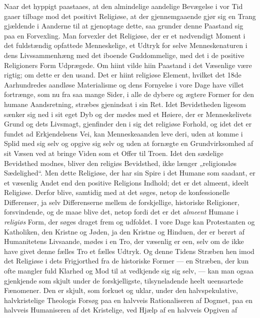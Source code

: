 \documentclass[12pt,a4paper,openany]{book}
\newcommand{\opage}[1]{\marginnote{\footnotesize\textit{[#1]}}}
\begin{document}
Naar det hyppigt paastaaes, at den almindelige aandelige
Bevægelse i vor Tid gaaer tilbage mod det positivt
Religiøse, at der gjennemgaaende gjør sig en Trang gjældende
i Aanderne til at gjenoptage dette, saa grunder denne
Paastand sig paa en Forvexling. Man forvexler det Religiøse,
der er et nødvendigt Moment i det fuldstændig opfattede
Menneskelige, et Udtryk for selve Menneskenaturen i
dens Livssammenhæng med det iboende Guddommelige, med
det i de positive Religioners Form Udprægede. Om hiint
vilde hiin Paastand i det Væsenlige være rigtig; om dette
er den usand. Det er hiint religiøse Element, hvilket det
18de Aarhundredes aandløse Materialisme og dens Fornyelse
i vore Dage have villet fortrænge, som nu fra saa
mange Sider, i alle de dybere og ægtere Former for den
humane Aandsretning, stræbes gjenindsat i sin Ret. Idet
Bevidstheden ligesom sænker sig ned i sit eget Dyb og der
mødes med et Høiere, der er Menneskelivets Grund og dets
\opage{296}Livsmagt, gjenfinder den i sig det religiøse Forhold, og idet
det er fundet ad Erkjendelsens Vei, kan Menneskeaanden
leve deri, uden at komme i Splid med sig selv og opgive
sig selv og uden at fornægte en Grundvirksomhed af sit
Væsen ved at bringe Viden som et Offer til Troen. Idet
den sædelige Bevidsthed modnes, bliver den religiøs Bevidsthed,
ikke længer „religionsløs Sædelighed“. Men dette Religiøse,
der har sin Spire i det Humane som saadant, er et
væsenlig Andet end den positive Religions Indhold; det er
det almeent, ideelt Religiøse. Derfor blive, samtidig med at
det søges, netop de konfessionelle Differenser, ja selv Differenserne
mellem de forskjellige, historiske Religioner, forsvindende,
og de maae blive det, netop fordi det er det \emph{almeent}
Humane i \emph{religiøs} Form, der søges draget frem og udfoldet.
I vore Dage kan Protestanten og Katholiken, den
Kristne og Jøden, ja den Kristne og Hinduen, der er berørt
af Humanitetens Livsaande, mødes i en Tro, der væsenlig
er een, selv om de ikke have givet denne fælles Tro et
fælles Udtryk. Og denne Tidens Stræben hen imod det
Religiøse i dets Frigjorthed fra de historiske Former --- en
Stræben, der kun ofte mangler fuld Klarhed og Mod til at
vedkjende sig sig selv, --- kan man ogsaa gjenkjende som skjult
under de forskjelligste, tilsyneladende heelt ueensartede Fænomener.
Den er skjult, som forkuet og uklar, under den
halvspekulative, halvkristelige Theologis Forsøg paa en halvveis
Rationaliseren af Dogmet, paa en halvveis Humaniseren
af det Kristelige, ved Hjælp af en halvveis Opgiven af
\end{document}
